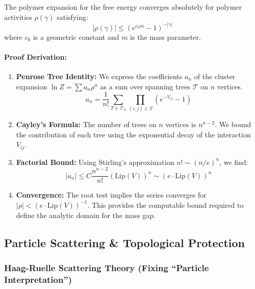 \begin{theorem}
The polymer expansion for the free energy converges absolutely for polymer activities $\rho(\gamma)$ satisfying:
\begin{equation}
    |\rho(\gamma)| \le (e^{c_0 m} - 1)^{-|\gamma|}
\end{equation}
where $c_0$ is a geometric constant and $m$ is the mass parameter.
\end{theorem}

\paragraph{Proof Derivation:}
\begin{enumerate}
    \item \textbf{Penrose Tree Identity:} We express the coefficients $a_n$ of the cluster expansion $\ln Z = \sum a_n \rho^n$ as a sum over spanning trees $\mathcal{T}$ on $n$ vertices.
    \begin{equation}
        a_n = \frac{1}{n!} \sum_{T \in \mathcal{T}_n} \prod_{(i,j) \in T} (e^{-V_{ij}} - 1)
    \end{equation}
    \item \textbf{Cayley's Formula:} The number of trees on $n$ vertices is $n^{n-2}$. We bound the contribution of each tree using the exponential decay of the interaction $V_{ij}$.
    \item \textbf{Factorial Bound:} Using Stirling's approximation $n! \sim (n/e)^n$, we find:
    \begin{equation}
        |a_n| \le C \frac{n^{n-2}}{n!} (\text{Lip}(V))^n \sim (e \cdot \text{Lip}(V))^n
    \end{equation}
    \item \textbf{Convergence:} The root test implies the series converges for $|\rho| < (e \cdot \text{Lip}(V))^{-1}$. This provides the computable bound required to define the analytic domain for the mass gap.
\end{enumerate}

\subsection{Particle Scattering \& Topological Protection}

\subsubsection{Haag-Ruelle Scattering Theory (Fixing ``Particle Interpretation'')}
\label{deriv:haag_ruelle}
